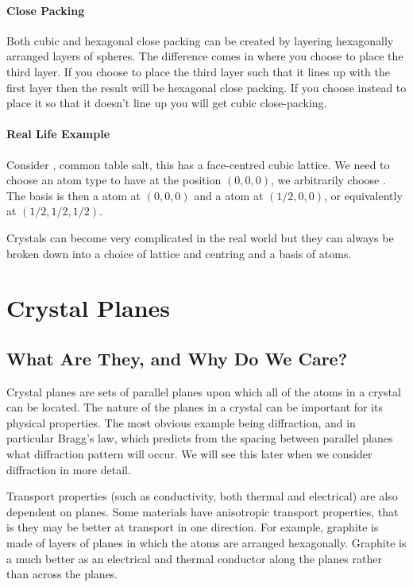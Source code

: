 \documentclass[fleqn]{NotesClass}
\begin{document}
    \subsubsection{Close Packing}
    Both cubic and hexagonal close packing can be created by layering hexagonally arranged layers of spheres.
    The difference comes in where you choose to place the third layer.
    If you choose to place the third layer such that it lines up with the first layer then the result will be hexagonal close packing.
    If you choose instead to place it so that it doesn't line up you will get cubic close-packing.
    
    \subsubsection{Real Life Example}
    Consider , common table salt, this has a face-centred cubic lattice.
    We need to choose an atom type to have at the position \((0, 0, 0)\), we arbitrarily choose .
    The basis is then a  atom at \((0, 0, 0)\) and a  atom at \((1/2,0,0)\), or equivalently at \((1/2,1/2,1/2)\).
    
    Crystals can become very complicated in the real world but they can always be broken down into a choice of lattice and centring and a basis of atoms.
    
    \chapter{Crystal Planes}
    \section{What Are They, and Why Do We Care?}
    Crystal planes are sets of parallel planes upon which all of the atoms in a crystal can be located.
    The nature of the planes in a crystal can be important for its physical properties.
    The most obvious example being diffraction, and in particular Bragg's law, which predicts from the spacing between parallel planes what diffraction pattern will occur.
    We will see this later when we consider diffraction in more detail.
    
    Transport properties (such as conductivity, both thermal and electrical) are also dependent on planes.
    Some materials have anisotropic transport properties, that is they may be better at transport in one direction.
    For example, graphite is made of layers of planes in which the atoms are arranged hexagonally.
    Graphite is a much better as an electrical and thermal conductor along the planes rather than across the planes.
    
\end{document}
